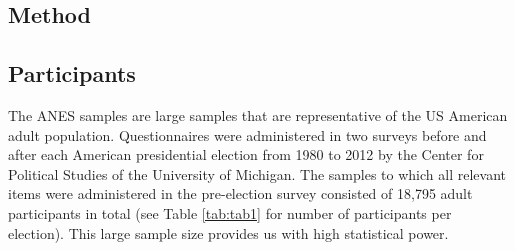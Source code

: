 \documentclass[10pt]{article}
\begin{document}
\begin{multicols}{2}
\section*{Method}
\subsection*{Participants}
The ANES samples are large samples that are representative of the US American adult population. Questionnaires were administered in two surveys before and after each American presidential election from 1980 to 2012 by the Center for Political Studies of the University of Michigan. The samples to which all relevant items were administered in the pre-election survey consisted of 18,795 adult participants in total (see Table \ref{tab:tab1} for number of participants per election). This large sample size provides us with high statistical power.

\end{multicols}
\end{document}
